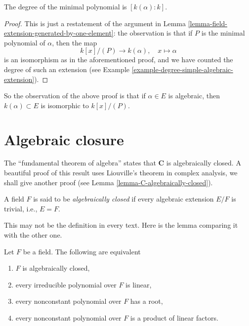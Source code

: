\begin{lemma}
\label{lemma-degree-minimal-polynomial}
The degree of the minimal polynomial is $[k(\alpha) : k]$.
\end{lemma}

\begin{proof}
This is just a restatement of the argument in
Lemma \ref{lemma-field-extension-generated-by-one-element}: the observation
is that if $P$ is the minimal polynomial of $\alpha$, then the map
$$
k[x]/(P) \to k(\alpha), \quad x \mapsto \alpha
$$
is an isomorphism as in the aforementioned proof, and we have counted the
degree of such an extension (see
Example \ref{example-degree-simple-algebraic-extension}).
\end{proof}

\noindent
So the observation of the above proof is that if $\alpha \in E$ is algebraic,
then $k(\alpha) \subset E$ is isomorphic to $k[x]/(P)$.


\section{Algebraic closure}
\label{section-algebraic-closure}

\noindent
The ``fundamental theorem of algebra'' states that $\mathbf{C}$ is
algebraically closed. A beautiful proof of this result uses
Liouville's theorem in complex analysis, we shall give another
proof (see Lemma \ref{lemma-C-algebraically-closed}).

\begin{definition}
\label{definition-algebraically-closed}
A field $F$ is said to be {\it algebraically closed} if every algebraic
extension $E/F$ is trivial, i.e., $E = F$.
\end{definition}

\noindent
This may not be the definition in every text. Here is the lemma comparing
it with the other one.

\begin{lemma}
\label{lemma-algebraically-closed}
Let $F$ be a field. The following are equivalent
\begin{enumerate}
\item $F$ is algebraically closed,
\item every irreducible polynomial over $F$ is linear,
\item every nonconstant polynomial over $F$ has a root,
\item every nonconstant polynomial over $F$ is a product of linear factors.
\end{enumerate}
\end{lemma}


